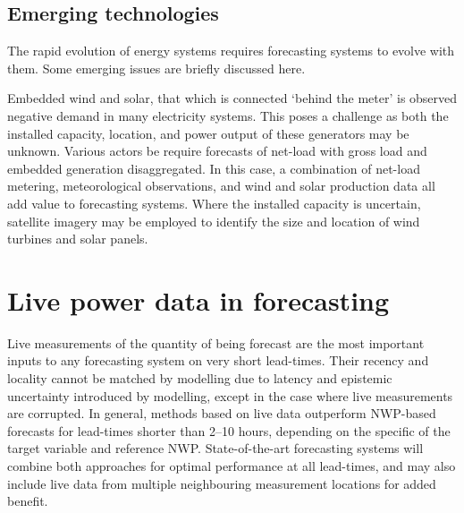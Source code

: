 \subsection{Emerging technologies {\color{magenta}{Contributing author: ?}}}\label{subsec:scadawind}

The rapid evolution of energy systems requires forecasting systems to evolve with them. Some emerging issues are briefly discussed here.

Embedded wind and solar, that which is connected `behind the meter' is observed negative demand in many electricity systems. This poses a challenge as both the installed capacity, location, and power output of these generators may be unknown. Various actors be require forecasts of net-load with gross load and embedded generation disaggregated. In this case, a combination of net-load metering, meteorological observations, and wind and solar production data all add value to forecasting systems. Where the installed capacity is uncertain, satellite imagery may be employed to identify the size and location of wind turbines and solar panels.





\section{Live power data in forecasting}
 \label{sec:live-data}

Live measurements of the quantity of being forecast are the most important inputs to any forecasting system on very short lead-times. Their recency and locality cannot be matched by modelling due to latency and epistemic uncertainty introduced by modelling, except in the case where live measurements are corrupted. In general, methods based on live data outperform NWP-based forecasts for lead-times shorter than 2--10 hours, depending on the specific of the target variable and reference NWP. State-of-the-art forecasting systems will combine both approaches for optimal performance at all lead-times, and may also include live data from multiple neighbouring measurement locations for added benefit.

